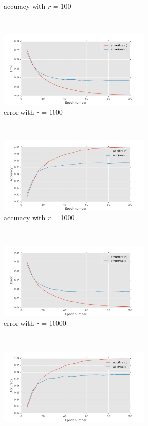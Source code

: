 \documentclass[11pt]{article}
\begin{document}
\begin{figure}[t!]
\begin{subfigure}[t]{0.45\textwidth}
        \caption{accuracy with $r$ = 100}
    \end{subfigure}
	~
    \begin{subfigure}[t]{0.45\textwidth}
        \centering
        \includegraphics[height=1.5in]{error_with_free_param_1000.pdf}
        \caption{error with $r$ = 1000}
    \end{subfigure}   
    ~
    \begin{subfigure}[t]{0.45\textwidth}
        \centering
        \includegraphics[height=1.5in]{acc_with_param_1000.pdf}
        \caption{accuracy with $r$ = 1000}
    \end{subfigure}    
	~
    \begin{subfigure}[t]{0.45\textwidth}
        \centering
        \includegraphics[height=1.5in]{error_with_free_param_10000.pdf}
        \caption{error with $r$ = 10000}
    \end{subfigure}   
    ~
    \begin{subfigure}[t]{0.45\textwidth}
        \centering
        \includegraphics[height=1.5in]{acc_with_param_10000.pdf}

\end{subfigure}
\end{figure}
\end{document}
